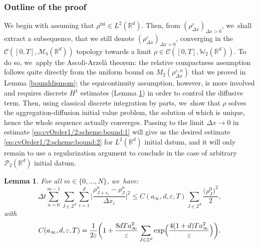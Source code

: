 \documentclass[11pt]{article}
\numberwithin{equation}{section}
\newcommand{\ini}{\mathrm{ini}}
\def\RR{\mathbb{R}}
\def\ZZ{\mathbb{Z}}
\def\WW{\mathbb{W}}
\def\eps{\varepsilon}
\def\dt{\Delta t}
\def\dx{\Delta x}
\def\calC{{\mathcal C}}
\def\calM{{\mathcal M}}
\def\calP{{\mathcal P}}
\theoremstyle{plain}
\newtheorem{lemma}[theorem]{Lemma}
\theoremstyle{definition}
\begin{document}
\subsubsection*{Outline of the proof}
We begin with assuming that $\rho^{\ini} \in L^2(\RR^d)$. Then, from $(\rho_{\dx}^\eps)_{\dx > 0}$, we~shall extract a subsequence, that we still denote $(\rho_{\dx}^\eps)_{\dx > 0}$, converging in the $\calC([0,T], \calM_b(\RR^d))$ topology towards a limit $\rho \in \calC([0,T], \WW_2(\RR^d))$. To do so, we~apply the Ascoli-Arzelà theorem: the relative compactness assumption follows quite directly from the uniform bound on $M_2(\rho_{\dx}^{\eps,n})$ that we proved in Lemma \ref{bounddismom}; the equicontinuity assumption, however, is more involved and requires discrete $H^1$ estimates (Lemma \ref{lemma:DiscreteH1Estimates}) in order to control the diffusive term. Then, using classical discrete integration by parts, we~show that $\rho$ solves the aggregation-diffusion initial value problem, the solution of which is unique, hence the whole sequence actually converges. Passing to the limit $\dx \to 0$ in estimate \eqref{eq:cvOrder1/2:scheme:bound:1} will give us the desired estimate \eqref{eq:cvOrder1/2:scheme:bound:2} for $L^2(\RR^d)$ initial datum, and it will only remain to use a regularization argument to conclude in the case of arbitrary $\calP_2(\RR^d)$ initial datum.
\begin{lemma}\label{lemma:DiscreteH1Estimates}
For all $m \in \{0, \ldots, N\}$, we~have:
\[
\dt\sum_{n=0}^{m-1} \sum_{J \in \ZZ^d} \sum_{i=1}^d \Big|\frac{\rho_{J+e_i}^n - \rho_J^n}{\dx_i}\Big|^2 \leq C(a_\infty, d, \eps,T) \sum_{J\in\ZZ^d} \frac{\big(\rho_J^0\big)^2}{2},
\]
with
\[
C(a_\infty, d, \eps,T) =
\frac{1}{2 \eps}\biggl(1 + \frac{8dT a_\infty^2}{\eps} \sum_{J\in\ZZ^d}
\exp\Bigl(\frac{4(1 + d)T a_\infty^2}{\eps}\Bigr)\biggr).
\]
\end{lemma}
\end{document}
